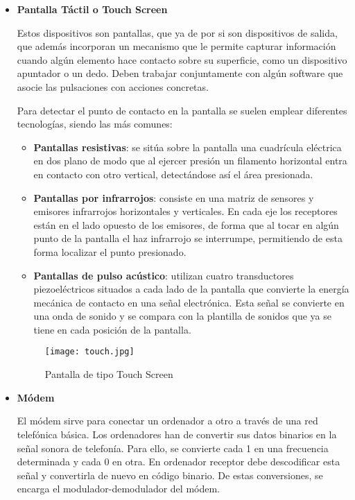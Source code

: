 \begin{itemize}
    \item \textbf{Pantalla Táctil o Touch Screen}

    Estos dispositivos son pantallas, que ya de por si son dispositivos de salida, que además incorporan un mecanismo que le permite capturar información cuando algún elemento hace contacto sobre su superficie, como un dispositivo apuntador o un dedo. Deben trabajar conjuntamente con algún software que asocie las pulsaciones con acciones concretas.

    Para detectar el punto de contacto en la pantalla se suelen emplear diferentes tecnologías, siendo las más comunes:

    \begin{itemize}
        \item \textbf{Pantallas resistivas}: se sitúa sobre la pantalla una cuadrícula eléctrica en dos plano de modo que al ejercer presión un filamento horizontal entra en contacto con otro vertical, detectándose así el área presionada.
        \item \textbf{Pantallas por infrarrojos}: consiste en una matriz de sensores y emisores infrarrojos horizontales y verticales. En cada eje los receptores están en el lado opuesto de los emisores, de forma que al tocar en algún punto de la pantalla el haz infrarrojo se interrumpe, permitiendo de esta forma localizar el punto presionado.
        \item \textbf{Pantallas de pulso acústico}: utilizan cuatro transductores piezoeléctricos situados a cada lado de la pantalla que convierte la energía mecánica de contacto en una señal electrónica. Esta señal se convierte en una onda de sonido y se compara con la plantilla de sonidos que ya se tiene en cada posición de la pantalla.
    \end{itemize}

    \begin{figure}[ht]
        \centering
        \texttt{[image: touch.jpg]}
        \caption{Pantalla de tipo Touch Screen}
    \end{figure}

    \item \textbf{Módem}

    El módem sirve para conectar un ordenador a otro a través de una red telefónica básica. Los ordenadores han de convertir sus datos binarios en la señal sonora de telefonía. Para ello, se convierte cada 1 en una frecuencia determinada y cada 0 en otra. En ordenador receptor debe descodificar esta señal y convertirla de nuevo en código binario. De estas conversiones, se encarga el modulador-demodulador del módem.


\end{itemize}
